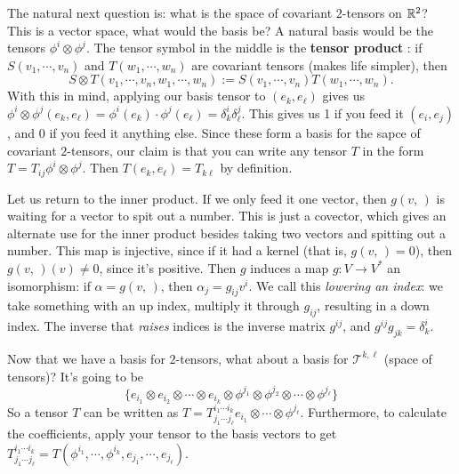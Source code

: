 The natural next question is: what is the space of covariant $2$-tensors on $\mathbb{R}^2$? This is a vector space, what would the basis be? A natural basis would be the tensors $\phi^i \otimes \phi^j $. The tensor symbol in the middle is the \textbf{tensor product} : if $S(v_1,\cdots ,v_n )$ and $T(w_1,\cdots ,w_n )$ are covariant tensors (makes life simpler), then \[
    S\otimes T (v_1,\cdots ,v_n ,w_1,\cdots ,w_n ):=S(v_1,\cdots ,v_n )T(w_1,\cdots ,w_n ).
\]With this in mind, applying our basis tensor to $(e_k,e_{\ell})$ gives us $\phi^i \otimes \phi^j (e_k,e_{\ell})=\phi^i (e_k)\cdot \phi^j (e_{\ell})=\delta^i _k\delta^j _{\ell}$. This gives us 1 if you feed it $(e_i ,e_j )$, and 0 if you feed it anything else. Since these form a basis for the sapce of covariant $2$-tensors, our claim is that you can write any tensor $T$ in the form $T=T_{ij}\phi^i \otimes \phi^j $. Then $T(e_k,e_{\ell})=T_{k\ell}$ by definition.


Let us return to the inner product. If we only feed it one vector, then $g(v,\,)$ is waiting for a vector to spit out a number. This is just a covector, which gives an alternate use for the inner product besides taking two vectors and spitting out a number. This map is injective, since if it had a kernel (that is, $g(v,\,)=0$), then $g(v,\,)(v) \neq 0$, since it's positive. Then $g$ induces a map $g \colon V \to V^*$ an isomorphism: if $\alpha =g(v,\,)$, then $\alpha _j =g_{ij}v^i $. We call this \emph{lowering an index}: we take something with an up index, multiply it through $g_{ij}$, resulting in a down index. The inverse that \emph{raises} indices is the inverse matrix $g^{ij}$, and $g^{ij}g_{jk}=\delta^i _k$.

Now that we have a basis for $2$-tensors, what about a basis for $\mathcal{T} ^{k,\ell}$ (space of tensors)? It's going to be \[
    \{e_{i_1}\otimes e_{i_2}\otimes \cdots \otimes e_{i_k}\otimes \phi^{j_1}\otimes \phi^{j_2}\otimes \cdots \otimes \phi^{j_{\ell}}\} 
\] So a tensor $T$ can be written as $T=T^{i_1\cdots i_k}_{j_1\cdots j_{\ell}}e_{i_1}\otimes \cdots \otimes \phi^{j_{\ell}}.$ Furthermore, to calculate the coefficients, apply your tensor to the basis vectors to get $T^{i_1\cdots i_k}_{j_1\cdots j_{\ell}}=T(\phi^{i_1},\cdots ,\phi^{i_k},e_{j_1},\cdots ,e_{j_{\ell}})$.

